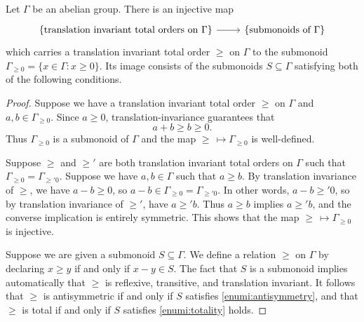 \begin{lemma}
\label{result:orders-and-submonoids}

Let $\Gamma$ be an abelian group. There is an injective map
\[ \begin{tikzcd} \left\{ \text{translation invariant total orders on } \Gamma \right\} \ar{r} & \left\{ \text{submonoids of } \Gamma \right\} \end{tikzcd} \]
which carries a translation invariant total order $\geq$ on $\Gamma$ to the submonoid $\Gamma_{\geq  0} = \{x \in \Gamma : x \geq 0 \}$. Its image consists of the submonoids $S \subseteq \Gamma$ satisfying both of the following conditions.
\end{lemma}

\begin{proof}
Suppose we have a translation invariant total order $\geq$ on $\Gamma$ and $a, b \in \Gamma_{\geq 0}$. Since $a \geq 0$, translation-invariance guarantees that 
\[ a+b \geq b \geq 0. \]
Thus $\Gamma_{\geq 0}$ is a submonoid of $\Gamma$ and the map $\geq\,\mapsto \Gamma_{\geq 0}$ is well-defined. 
	
Suppose $\geq$ and $\geq'$ are both translation invariant total orders on $\Gamma$ such that $\Gamma_{\geq 0} = \Gamma_{\geq' 0}$. Suppose we have $a, b \in \Gamma$ such that $a \geq b$. By translation invariance of $\geq$, we have $a - b \geq 0$, so $a - b \in \Gamma_{\geq 0} = \Gamma_{\geq' 0}$. In other words, $a - b \geq' 0$, so by translation invariance of $\geq'$, have $a \geq' b$. Thus $a \geq b$ implies $a \geq' b$, and the converse implication is entirely symmetric. This shows that the map $\geq\,\mapsto \Gamma_{\geq 0}$ is injective.
	
Suppose we are given a submonoid $S \subseteq \Gamma$. We define a relation $\geq$ on $\Gamma$ by declaring $x \geq y$ if and only if $x - y \in S$. The fact that $S$ is a submonoid implies automatically that $\geq$ is reflexive, transitive, and translation invariant. It follows that $\geq$ is antisymmetric if and only if $S$ satisfies \cref{enumi:antisymmetry}, and that $\geq$ is total if and only if $S$ satisfies  \cref{enumi:totality} holds.
\end{proof}

